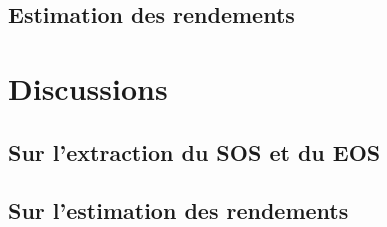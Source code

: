 \subsection{Estimation des rendements}
  
\section{Discussions}

\subsection{Sur l'extraction du SOS et du EOS}

\subsection{Sur l'estimation des rendements}
